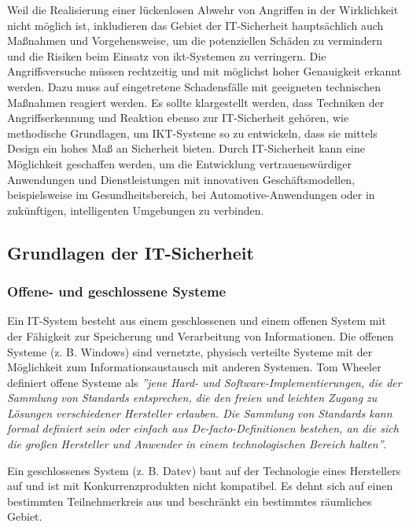 Weil die Realisierung einer lückenlosen Abwehr von Angriffen in der Wirklichkeit nicht möglich ist, inkludieren das Gebiet der IT-Sicherheit hauptsächlich auch Maßnahmen und Vorgehensweise, um die potenziellen Schäden zu vermindern und die Risiken beim Einsatz von \gls{ikt}-Systemen zu verringern. Die Angriffsversuche müssen rechtzeitig und mit möglichst hoher Genauigkeit erkannt werden. Dazu muss auf eingetretene Schadensfälle mit geeigneten technischen Maßnahmen reagiert werden. Es sollte klargestellt werden, dass Techniken der Angriffserkennung und Reaktion ebenso zur IT-Sicherheit gehören, wie methodische Grundlagen, um IKT-Systeme so zu entwickeln, dass sie mittels Design ein hohes Maß an Sicherheit bieten. Durch IT-Sicherheit kann eine Möglichkeit geschaffen werden, um die Entwicklung vertrauenswürdiger Anwendungen und Dienstleistungen mit innovativen Geschäftsmodellen, beispielsweise im Gesundheitsbereich, bei Automotive-Anwendungen oder in zukünftigen, intelligenten Umgebungen zu verbinden\cite[20--21]{eckert2013sicherheit}.

\subsection{Grundlagen der IT-Sicherheit}

\subsubsection{Offene- und geschlossene Systeme}

Ein IT-System besteht aus einem geschlossenen und einem offenen System mit der Fähigkeit zur Speicherung und Verarbeitung von Informationen. Die offenen Systeme (z. B. Windows) sind vernetzte, physisch verteilte Systeme mit der Möglichkeit zum Informationsaustausch mit anderen Systemen\cite[22--23]{eckert2013sicherheit}. Tom Wheeler definiert offene Systeme als \emph{''jene Hard- und Software-Implementierungen, die der Sammlung von Standards entsprechen, die den freien und leichten Zugang zu Lösungen verschiedener Hersteller erlauben. Die Sammlung von Standards kann formal definiert sein oder einfach aus De-facto-Definitionen bestehen, an die sich die großen Hersteller und Anwender in einem technologischen Bereich halten''}\cite[4]{wheeler2013offene}. 

Ein geschlossenes System (z. B. Datev) baut auf der Technologie eines Herstellers auf und ist mit Konkurrenzprodukten nicht kompatibel.  Es dehnt sich auf einen bestimmten Teilnehmerkreis aus und beschränkt ein bestimmtes räumliches Gebiet\cite[22--23]{eckert2013sicherheit}.

